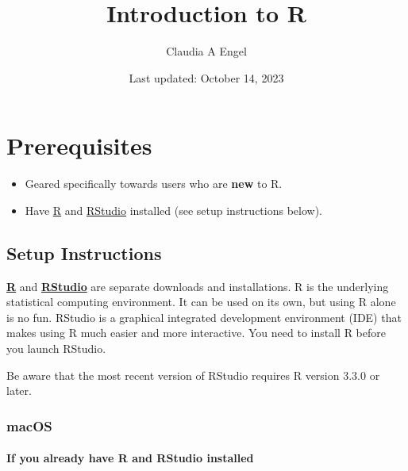 \documentclass[
]{book}
\title{Introduction to R}
\author{Claudia A Engel}
\date{Last updated: October 14, 2023}
\providecommand{\tightlist}{%
  \setlength{\itemsep}{0pt}\setlength{\parskip}{0pt}}
\begin{document}
\maketitle

{
\setcounter{tocdepth}{1}
\tableofcontents
}
\hypertarget{prerequisites}{%
\chapter*{Prerequisites}\label{prerequisites}}

\begin{itemize}
\tightlist
\item
  Geared specifically towards users who are \textbf{new} to R.\\
\item
  Have \href{https://cran.r-project.org/}{R} and \href{https://posit.co/download/rstudio-desktop/}{RStudio} installed (see setup instructions below).
\end{itemize}

\hypertarget{setup-instructions}{%
\section*{Setup Instructions}\label{setup-instructions}}

\href{https://cran.r-project.org/}{\textbf{R}} and \href{https://posit.co/download/rstudio-desktop/}{\textbf{RStudio}} are separate downloads and installations. R is the
underlying statistical computing environment. It can be used on its own, but using R alone is no fun. RStudio is a graphical integrated development environment (IDE) that makes using R much easier and more interactive. You need to install R before you launch RStudio.

Be aware that the most recent version of RStudio requires R version 3.3.0 or later.

\hypertarget{macos}{%
\subsection*{macOS}\label{macos}}

\hypertarget{if-you-already-have-r-and-rstudio-installed}{%
\subsubsection*{If you already have R and RStudio installed}\label{if-you-already-have-r-and-rstudio-installed}}
\end{document}
